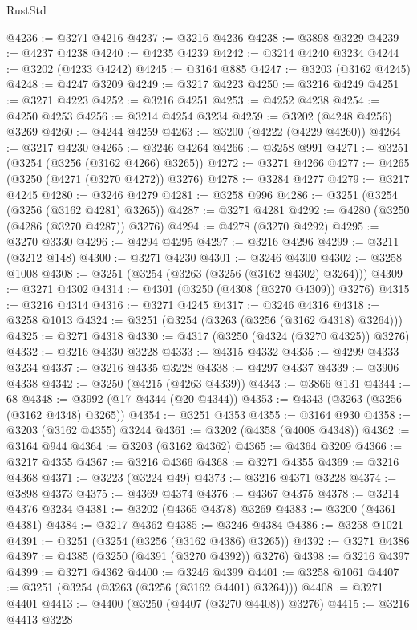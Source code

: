 \begin{lexlean}{RustStd}
\begin{coremodule}
@4236 := @3271 @4216
@4237 := @3216 @4236
@4238 := @3898 @3229
@4239 := @4237 @4238
@4240 := @4235 @4239
@4242 := @3214 @4240 @3234
@4244 := @3202 (@4233 @4242)
@4245 := @3164 @885
@4247 := @3203 (@3162 @4245)
@4248 := @4247 @3209
@4249 := @3217 @4223
@4250 := @3216 @4249
@4251 := @3271 @4223
@4252 := @3216 @4251
@4253 := @4252 @4238
@4254 := @4250 @4253
@4256 := @3214 @4254 @3234
@4259 := @3202 (@4248 @4256) @3269
@4260 := @4244 @4259
@4263 := @3200 (@4222 (@4229 @4260))
@4264 := @3217 @4230
@4265 := @3246 @4264
@4266 := @3258 @991
@4271 := @3251 (@3254 (@3256 (@3162 @4266) @3265))
@4272 := @3271 @4266
@4277 := @4265 (@3250 (@4271 (@3270 @4272)) @3276)
@4278 := @3284 @4277
@4279 := @3217 @4245
@4280 := @3246 @4279
@4281 := @3258 @996
@4286 := @3251 (@3254 (@3256 (@3162 @4281) @3265))
@4287 := @3271 @4281
@4292 := @4280 (@3250 (@4286 (@3270 @4287)) @3276)
@4294 := @4278 (@3270 @4292)
@4295 := @3270 @3330
@4296 := @4294 @4295
@4297 := @3216 @4296
@4299 := @3211 (@3212 @148)
@4300 := @3271 @4230
@4301 := @3246 @4300
@4302 := @3258 @1008
@4308 := @3251 (@3254 (@3263 (@3256 (@3162 @4302) @3264)))
@4309 := @3271 @4302
@4314 := @4301 (@3250 (@4308 (@3270 @4309)) @3276)
@4315 := @3216 @4314
@4316 := @3271 @4245
@4317 := @3246 @4316
@4318 := @3258 @1013
@4324 := @3251 (@3254 (@3263 (@3256 (@3162 @4318) @3264)))
@4325 := @3271 @4318
@4330 := @4317 (@3250 (@4324 (@3270 @4325)) @3276)
@4332 := @3216 @4330 @3228
@4333 := @4315 @4332
@4335 := @4299 @4333 @3234
@4337 := @3216 @4335 @3228
@4338 := @4297 @4337
@4339 := @3906 @4338
@4342 := @3250 (@4215 (@4263 @4339))
@4343 := @3866 @131
@4344 := 68
@4348 := @3992 (@17 @4344 (@20 @4344))
@4353 := @4343 (@3263 (@3256 (@3162 @4348) @3265))
@4354 := @3251 @4353
@4355 := @3164 @930
@4358 := @3203 (@3162 @4355) @3244
@4361 := @3202 (@4358 (@4008 @4348))
@4362 := @3164 @944
@4364 := @3203 (@3162 @4362)
@4365 := @4364 @3209
@4366 := @3217 @4355
@4367 := @3216 @4366
@4368 := @3271 @4355
@4369 := @3216 @4368
@4371 := @3223 (@3224 @49)
@4373 := @3216 @4371 @3228
@4374 := @3898 @4373
@4375 := @4369 @4374
@4376 := @4367 @4375
@4378 := @3214 @4376 @3234
@4381 := @3202 (@4365 @4378) @3269
@4383 := @3200 (@4361 @4381)
@4384 := @3217 @4362
@4385 := @3246 @4384
@4386 := @3258 @1021
@4391 := @3251 (@3254 (@3256 (@3162 @4386) @3265))
@4392 := @3271 @4386
@4397 := @4385 (@3250 (@4391 (@3270 @4392)) @3276)
@4398 := @3216 @4397
@4399 := @3271 @4362
@4400 := @3246 @4399
@4401 := @3258 @1061
@4407 := @3251 (@3254 (@3263 (@3256 (@3162 @4401) @3264)))
@4408 := @3271 @4401
@4413 := @4400 (@3250 (@4407 (@3270 @4408)) @3276)
@4415 := @3216 @4413 @3228

\end{coremodule}
\end{lexlean}
